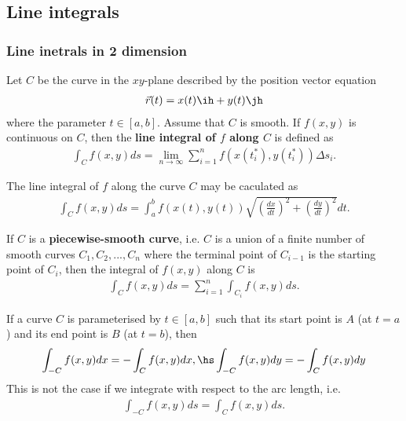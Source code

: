 \documentclass{article}
\begin{document}
\subsection{Line integrals}


\subsubsection{Line inetrals in 2 dimension}

\begin{definition}
	Let $C$ be the curve in the $xy$-plane described by the position vector equation
	\begin{align*}
		\vec r(t) = x(t)\ih + y(t)\jh
	\end{align*}
	where the parameter $t\in[a,b]$. Assume that $C$ is smooth.
	If $f(x,y)$ is continuous on $C$, then the \textbf{line integral of $f$ along $C$} is
	defined as
	\begin{align*}
		\int_C f(x,y) ds = \lim_{n\to\infty} \sum_{i=1}^n f(x(t_i^*), y(t_i^*))\Delta s_i.
	\end{align*}
\end{definition}
\begin{theorem}
	The line integral of $f$ along the curve $C$ may be caculated as
	\begin{align*}
		\int_C f(x,y)ds = \int_a^b f(x(t), y(t))\sqrt{\left(\frac{dx}{dt}\right)^2 +
			\left(\frac{dy}{dt}\right)^2}dt.
	\end{align*}
\end{theorem}
\begin{theorem}
	If $C$ is a \textbf{piecewise-smooth curve}, i.e. $C$ is a union of a finite number of smooth
	curves $C_1, C_2, ..., C_n$ where the terminal point of $C_{i-1}$ is the starting point
	of $C_i$, then the integral of $f(x,y)$ along $C$ is
	\begin{align*}
		\int_C f(x,y)ds = \sum_{i=1}^n \int_{C_i} f(x,y)ds.
	\end{align*}
\end{theorem}
\begin{lemma}
	If a curve $C$ is parameterised by $t\in[a,b]$ such that its start point is $A$
	(at $t=a$) and its end point is $B$ (at $t=b$), then
	\begin{align*}
		\int_{-C} f(x,y)dx = -\int_C f(x,y)dx,\hs
		\int_{-C}f(x,y)dy = -\int_C f(x,y)dy
	\end{align*}
	This is not the case if we integrate with respect to the arc length, i.e.
	\begin{align*}
		\int_{-C}f(x,y)ds = \int_C f(x,y)ds.
	\end{align*}
\end{lemma}
\end{document}
